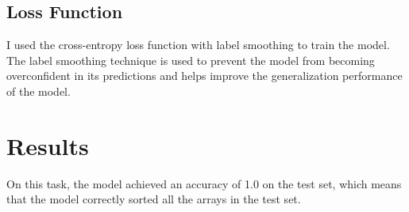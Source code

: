 \documentclass{article}
\begin{document}
\subsection{Loss Function}
I used the cross-entropy loss function with label smoothing to train the model. The label smoothing technique \cite{LabelSmoothing} is used to prevent the model from becoming overconfident in its predictions and helps improve the generalization performance of the model.



\section{Results}
On this task, the model achieved an accuracy of 1.0 on the test set, which means that the model correctly sorted all the arrays in the test set.
\end{document}
